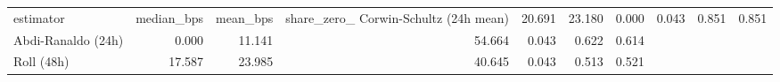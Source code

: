 \begin{tabular}{lrrrrrr}
\toprule
estimator & median_bps & mean_bps & share_zero_%
\midrule
Corwin-Schultz (24h mean) & 20.691 & 23.180 & 0.000 & 0.043 & 0.851 & 0.851 \\
Abdi-Ranaldo (24h) & 0.000 & 11.141 & 54.664 & 0.043 & 0.622 & 0.614 \\
Roll (48h) & 17.587 & 23.985 & 40.645 & 0.043 & 0.513 & 0.521 \\
\bottomrule
\end{tabular}

